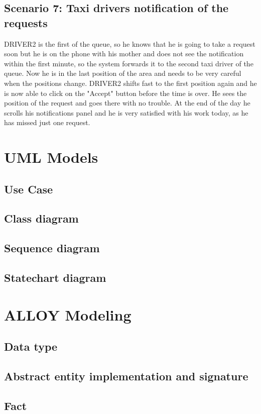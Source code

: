 \documentclass[18pt,oneside,a4paper, titlepage]{article}
\begin{document}
	\subsection{Scenario 7: Taxi drivers notification of the requests}
		DRIVER2 is the first of the queue, so he knows that he is going to take a request soon but he is on the phone with his mother and does not see the notification within the first minute, so the system forwards it to the second taxi driver of the queue. Now he is in the last position of the area and needs to be very careful when the positions change. DRIVER2 shifts fast to the first position again and he is now able to click on the "Accept" button before the time is over. He sees the position of the request and goes there with no trouble. At the end of the day he scrolls his notifications panel and he is very satisfied with his work today, as he has missed just one request.
\newpage
\section{UML Models}
	\subsection{Use Case}
	\subsection{Class diagram}
	\subsection{Sequence diagram}
	\subsection{Statechart diagram}

\newpage
\section{ALLOY Modeling}
	\subsection{Data type}
	\subsection{Abstract entity implementation and signature}
	\subsection{Fact}
\end{document}
